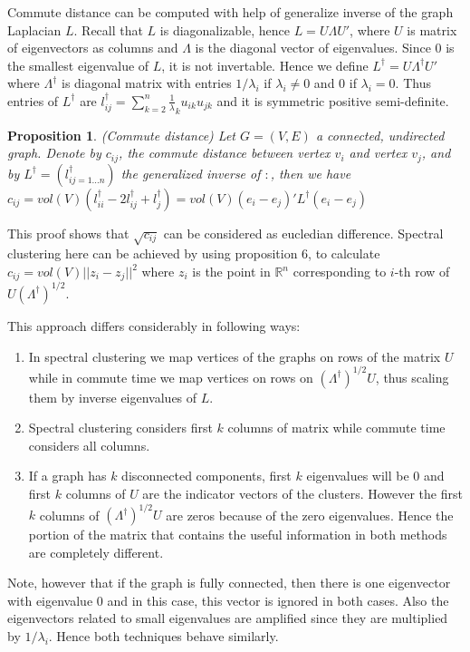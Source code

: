 \documentclass[10pt,a4paper, nocenter]{report}
\newtheorem{prop}{Proposition}
\newcommand{\norm}[1]{\lvert\lvert {#1} \rvert\rvert}
\begin{document}
	Commute distance can be computed with help of generalize inverse of the graph Laplacian $L$. Recall that $L$ is diagonalizable, hence $L = U\Lambda U'$, where $U$ is matrix of eigenvectors as columns and $\Lambda$ is the diagonal vector of eigenvalues. Since $0$ is the smallest eigenvalue of $L$, it is not invertable. Hence we define $L^{\dagger} = U\Lambda^{\dagger}U'$ where $\Lambda^{\dagger}$ is diagonal matrix with entries $1/\lambda_{i}$ if $\lambda_{i} \ne 0$ and $0$ if $\lambda_{i}=0$. Thus entries of $L^{\dagger}$ are $l^{\dagger}_{ij} = \sum_{k=2}^{n}\frac{1}{\lambda}_{k}u_{ik}u_{jk}$ and it is symmetric positive semi-definite. 
	
	\begin{prop}(Commute distance) Let $G=(V,E)$ a connected, undirected graph. Denote by $c_{ij}$, the commute distance between vertex $v_{i}$ and vertex $v_{j}$, and  by $L^{\dagger}=(l^{\dagger}_{ij=1\dots n})$ the generalized inverse of $:$, then we have $c_{ij} = vol(V)(l^{\dagger}_{ii}-2l^{\dagger}_{ij}+l^{\dagger}_{j}) = vol(V)(e_{i}-e_{j})'
			L^{\dagger}(e_{i}-e_{j})$
	\end{prop}

	This proof shows that $\sqrt{c_{ij}}$ can be considered as eucledian difference. Spectral clustering here can be achieved by using proposition 6, to calculate $c_{ij} = vol(V)\norm{z_{i}-z_{j}}^{2}$ where $z_{i}$ is the point in $\mathbb{R}^{n}$ corresponding to $i$-th row of $U(\Lambda^{\dagger})^{1/2}$.
	
	This approach differs considerably in following ways:
	\begin{enumerate}
		\item In spectral clustering we map vertices of the graphs on rows of the matrix $U$ while in commute time we map vertices on rows on $(\Lambda^{\dagger})^{1/2}U$, thus scaling them by inverse eigenvalues of $L$.
		\item Spectral clustering considers first $k$ columns of matrix while commute time considers all columns. 
		\item If a graph has $k$ disconnected components, first $k$ eigenvalues will be 0 and first $k$ columns of $U$ are the indicator vectors of the clusters. However the first $k$ columns of $(\Lambda^{\dagger})^{1/2}U$ are zeros because of the zero eigenvalues. Hence the portion of the matrix that contains the useful information in both methods are completely different.  
	\end{enumerate}
	
	Note, however that if the graph is fully connected, then there is one eigenvector with eigenvalue 0 and in this case, this vector is ignored in both cases. Also the eigenvectors related to small eigenvalues are amplified since they are multiplied by $1/\lambda_{i}$. Hence both techniques behave similarly.
\end{document}
